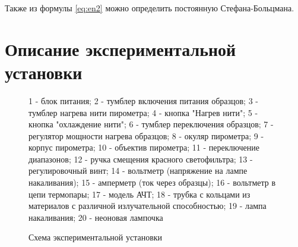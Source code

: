 \documentclass[12pt]{article}
\begin{document}
    Также из формулы \ref{eq:en2} можно определить постоянную Стефана-Больцмана.

  \section{Описание экспериментальной установки}

    \begin{figure}[h]
      \begin{minipage}[h]{0.49\linewidth}
        \caption{Схема экспериментальной установки}
      \end{minipage}
      \begin{minipage}[h]{0.49\linewidth}
        1 - блок питания;
        2 - тумблер включения питания образцов;
        3 - тумблер нагрева нити пирометра;
        4 - кнопка "Нагрев нити";
        5 - кнопка "охлаждение нити";
        6 - тумблер переключения образцов;
        7 - регулятор мощности нагрева образцов;
        8 - окуляр пирометра;
        9 - корпус пирометра;
        10 - объектив пирометра;
        11 - переключение диапазонов;
        12 - ручка смещения красного светофильтра;
        13 - регулировочный винт;
        14 - вольтметр (напряжение на лампе накаливания);
        15 - амперметр (ток через образцы);
        16 - вольтметр в цепи термопары;
        17 - модель АЧТ;
        18 - трубка с кольцами из материалов с различной излучательной
        способностью;
        19 - лампа накаливания;
        20 - неоновая лампочка
      \end{minipage}
      \label{fig:setup}
    \end{figure}
\end{document}
